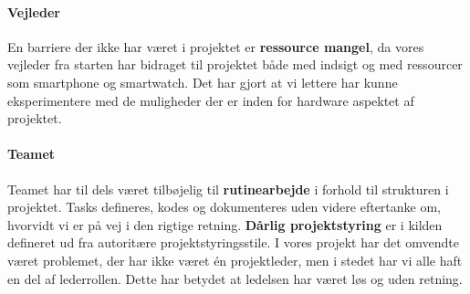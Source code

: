 \paragraph{Vejleder}
En barriere der ikke har været i projektet er \textbf{ressource mangel}, da vores vejleder fra starten har bidraget til projektet både med indsigt og med ressourcer som smartphone og smartwatch.
Det har gjort at vi lettere har kunne eksperimentere med de muligheder der er inden for hardware aspektet af projektet.

\paragraph{Teamet}
Teamet har til dels været tilbøjelig til \textbf{rutinearbejde} i forhold til strukturen i projektet.
Tasks defineres, kodes og dokumenteres uden videre eftertanke om, hvorvidt vi er på vej i den rigtige retning.
\textbf{Dårlig projektstyring} er i kilden defineret ud fra autoritære projektstyringsstile.
I vores projekt har det omvendte været problemet, der har ikke været én projektleder, men i stedet har vi alle haft en del af lederrollen.
Dette har betydet at ledelsen har været løs og uden retning.